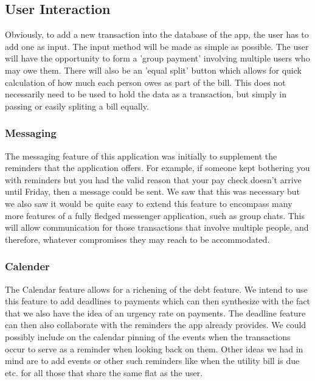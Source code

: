 \documentclass[a4paper,9t]{article}
\begin{document}
\subsection*{User Interaction}
Obviously, to add a new transaction into the database of the app, the user has to add one as input. The input method will be made as simple as possible. The user will have the opportunity to form a 'group payment' involving multiple users who may owe them. There will also be an 'equal split' button which allows for quick calculation of how much each person owes as part of the bill. This does not necessarily need to be used to hold the data as a transaction, but simply in passing or easily spliting a bill equally.

\subsubsection*{Messaging}
The messaging feature of this application was initially to supplement the reminders that the application offers. For example, if someone kept bothering you with reminders but you had the valid reason that your pay check doesn't arrive until Friday, then a message could be sent.
We saw that this was necessary but we also saw it would be quite easy to extend this feature to encompass many more features of a fully fledged messenger application, such as group chats. This will allow communication for those transactions that involve multiple people, and therefore, whatever compromises they may reach to be accommodated.

\subsubsection*{Calender}
The Calendar feature allows for a richening of the debt feature. We intend to use this feature to add deadlines to payments which can then synthesize with the fact that we also have the idea of an urgency rate on payments. The deadline feature can then also collaborate with the reminders the app already provides.
We could possibly include on the calendar pinning of the events when the transactions occur to serve as a reminder when looking back on them. Other ideas we had in mind are to add events or other such reminders like when the utility bill is due etc. for all those that share the same flat as the user.
\end{document}
